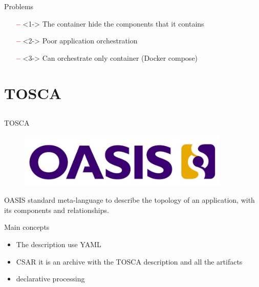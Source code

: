 \documentclass{beamer}
\begin{document}
  \begin{frame}{Problems}
    \begin{itemize}
      \item[\textcolor{red}{\textbf{--}}]<1-> The container hide the components that it contains
      \item[\textcolor{red}{\textbf{--}}]<2-> Poor application orchestration
      \item[\textcolor{red}{\textbf{--}}]<3-> Can orchestrate only container (Docker compose)
    \end{itemize}
  \end{frame}

\section{TOSCA}\subsection*{}
  \begin{frame}{TOSCA}
    \begin{figure}
      \includegraphics[width=0.9\textwidth]{img/oasis.png}
    \end{figure}
    OASIS standard meta-language to describe the topology of an application, with its components and relationships.
  \end{frame}

  \begin{frame}{Main concepts}
      \begin{itemize}
        \item The description use YAML
        \item CSAR it is an archive with the TOSCA description and all the artifacts
        \item declarative processing
      \end{itemize}
  \end{frame}
\end{document}
